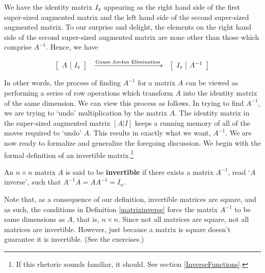 \documentclass{ximera}
\begin{document}
We have the identity matrix $I_{\mbox{\tiny$2$}}$ appearing as the right hand side of the first super-sized augmented matrix and the left hand side of the second super-sized augmented matrix.  To our surprise and delight, the elements on the right hand side of the second super-sized augmented matrix are none other than those which comprise $A^{-1}$.  Hence, we have

\[ \begin{array}{ccc}

\left[ \begin{array}{c|c} A & I_{\mbox{\tiny$2$}} \end{array} \right]

&
\xrightarrow{\text{Gauss Jordan Elimination}}

&

\left[ \begin{array}{c|c} I_{\mbox{\tiny$2$}} & A^{-1} \end{array} \right] 

\end{array}\]

In other words, the process of finding $A^{-1}$ for a matrix $A$ can be viewed as performing a series of row operations which transform $A$ into the identity matrix of the same dimension.  We can view this process as follows.  In trying to find $A^{-1}$, we are trying to `undo' multiplication by the matrix $A$.  The identity matrix in the  super-sized augmented matrix $[A | I]$ keeps a running memory of all of the moves required to `undo' $A$. This results in exactly what we want, $A^{-1}$.  We are now ready to formalize and generalize the foregoing discussion.  We begin with the formal definition of an invertible matrix.\footnote{If this rhetoric sounds familiar, it should. See section \ref{InverseFunctions}.} 

\smallskip


\begin{definition}  \label{matrixinverse}  An $n \times n$ matrix $A$ is said to be \textbf{invertible} if there exists a matrix $A^{-1}$, read `$A$ inverse', such that $A^{-1}A = AA^{-1}=I_{n}$. 
\end{definition}


\smallskip

Note that, as a consequence of our definition, invertible matrices are square, and as such, the conditions in Definition \ref{matrixinverse} force the matrix $A^{-1}$ to be same dimensions as $A$, that is, $n \times n$.  Since not all matrices are square, not all matrices are invertible.  However, just because a matrix is square doesn't guarantee it is invertible.  (See the exercises.)   
\end{document}
